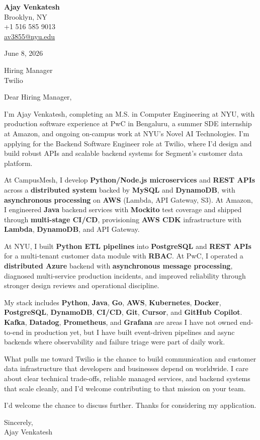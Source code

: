 \documentclass[letterpaper,11pt]{article}
\begin{document}
\begin{flushleft}
\textbf{\large Ajay Venkatesh} \\
Brooklyn, NY \\
+1 516 585 9013 \\
\href{mailto:av3855@nyu.edu}{av3855@nyu.edu}
\end{flushleft}
\vspace{10pt}
June 8, 2026
\vspace{6pt}

Hiring Manager \\
Twilio

\vspace{10pt}

Dear Hiring Manager,

I'm Ajay Venkatesh, completing an M.S. in Computer Engineering at NYU, with production software experience at PwC in Bengaluru, a summer SDE internship at Amazon, and ongoing on-campus work at NYU's Novel AI Technologies. I'm applying for the Backend Software Engineer role at Twilio, where I'd design and build robust APIs and scalable backend systems for Segment's customer data platform.

At CampusMesh, I develop \textbf{Python/Node.js microservices} and \textbf{REST APIs} across a \textbf{distributed system} backed by \textbf{MySQL} and \textbf{DynamoDB}, with \textbf{asynchronous processing} on \textbf{AWS} (Lambda, API Gateway, S3). At Amazon, I engineered \textbf{Java} backend services with \textbf{Mockito} test coverage and shipped through \textbf{multi-stage CI/CD}, provisioning \textbf{AWS CDK} infrastructure with \textbf{Lambda}, \textbf{DynamoDB}, and API Gateway.

At NYU, I built \textbf{Python ETL pipelines} into \textbf{PostgreSQL} and \textbf{REST APIs} for a multi-tenant customer data module with \textbf{RBAC}. At PwC, I operated a \textbf{distributed Azure} backend with \textbf{asynchronous message processing}, diagnosed multi-service production incidents, and improved reliability through stronger design reviews and operational discipline.

My stack includes \textbf{Python}, \textbf{Java}, \textbf{Go}, \textbf{AWS}, \textbf{Kubernetes}, \textbf{Docker}, \textbf{PostgreSQL}, \textbf{DynamoDB}, \textbf{CI/CD}, \textbf{Git}, \textbf{Cursor}, and \textbf{GitHub Copilot}. \textbf{Kafka}, \textbf{Datadog}, \textbf{Prometheus}, and \textbf{Grafana} are areas I have not owned end-to-end in production yet, but I have built event-driven pipelines and async backends where observability and failure triage were part of daily work.

What pulls me toward Twilio is the chance to build communication and customer data infrastructure that developers and businesses depend on worldwide. I care about clear technical trade-offs, reliable managed services, and backend systems that scale cleanly, and I'd welcome contributing to that mission on your team.

I'd welcome the chance to discuss further. Thanks for considering my application.

\vspace{12pt}
Sincerely, \\
Ajay Venkatesh
\end{document}
